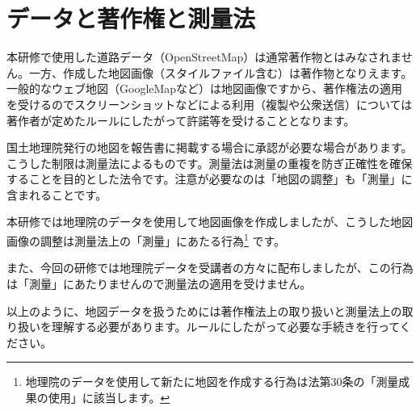 \documentclass[14Q,twocolumn]{jsarticle}
\begin{document}
\section{データと著作権と測量法}
本研修で使用した道路データ（OpenStreetMap）は通常著作物とはみなされません。一方、作成した地図画像（スタイルファイル含む）は著作物となりえます。一般的なウェブ地図（GoogleMapなど）は地図画像ですから、著作権法の適用を受けるのでスクリーンショットなどによる利用（複製や公衆送信）については著作者が定めたルールにしたがって許諾等を受けることとなります。

国土地理院発行の地図を報告書に掲載する場合に承認が必要な場合があります。こうした制限は測量法によるものです。測量法は測量の重複を防ぎ正確性を確保することを目的とした法令です。注意が必要なのは「地図の調整」も「測量」に含まれることです。

本研修では地理院のデータを使用して地図画像を作成しましたが、こうした地図画像の調整は測量法上の「測量」にあたる行為\footnote{
地理院のデータを使用して新たに地図を作成する行為は法第30条の「測量成果の使用」に該当します。
}
です。

また、今回の研修では地理院データを受講者の方々に配布しましたが、この行為は「測量」にあたりませんので測量法の適用を受けません。

以上のように、地図データを扱うためには著作権法上の取り扱いと測量法上の取り扱いを理解する必要があります。ルールにしたがって必要な手続きを行ってください。



\end{document}
